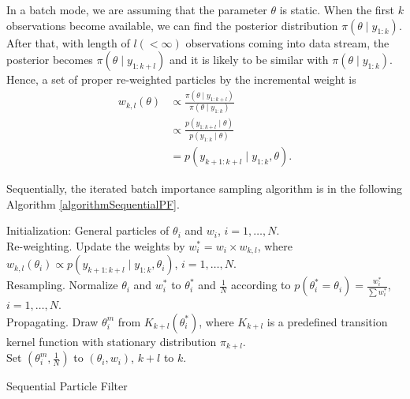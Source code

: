 In a batch mode, we are assuming that the parameter $\theta$ is static. When the first $k$ observations become available, we can find the posterior distribution $\pi(\theta\mid y_{1:k})$. After that, with length of $l (<\infty)$ observations coming into data stream, the posterior becomes $\pi(\theta\mid y_{1:k+l})$ and it is likely to be similar with $\pi(\theta\mid y_{1:k})$.  Hence, a set of proper re-weighted particles by the incremental weight is 
\begin{equation}
\begin{split}
w_{k,l}(\theta) &\propto \frac{\pi(\theta\mid y_{1:k+l}) }{\pi(\theta\mid y_{1:k})} \\
&\propto \frac{p(y_{1:k+l}\mid \theta) }{p(y_{1:k}\mid\theta)} \\
&=p(y_{k+1:k+l}\mid y_{1:k},\theta). 
\end{split}
\end{equation}


Sequentially, the iterated batch importance sampling algorithm is in the following Algorithm \ref{algorithmSequentialPF}. 
\begin{algorithm}[h]
\SetAlgoLined 
Initialization:  General particles of $\theta_i$ and $w_i$, $i=1,\ldots,N$.\\
 {Re-weighting. Update the weights by $w_i^*=w_i \times w_{k,l}$, where $w_{k,l}(\theta_i)\propto p(y_{k+1:k+l}\mid y_{1:k},\theta_i)$, $i=1,\ldots,N$. \\
Resampling. Normalize $\theta_i$ and $w^*_i$ to $\theta_i^*$ and $\frac{1}{N}$ according to $p(\theta_i^*=\theta_i)=\frac{w_i^*}{\sum w_i^*}$,  $i=1,\ldots,N$. \\
Propagating. Draw $\theta_i^m$ from $K_{k+l}(\theta_i^*)$, where $K_{k+l}$ is a predefined transition kernel function with stationary distribution $\pi_{k+l}$.\\
Set $(\theta_i^m,\frac{1}{N})$ to $(\theta_i,w_i)$, $k+l$ to $k$.}
 \caption{Sequential Particle Filter}\label{algorithmSequentialPF}
\end{algorithm}

